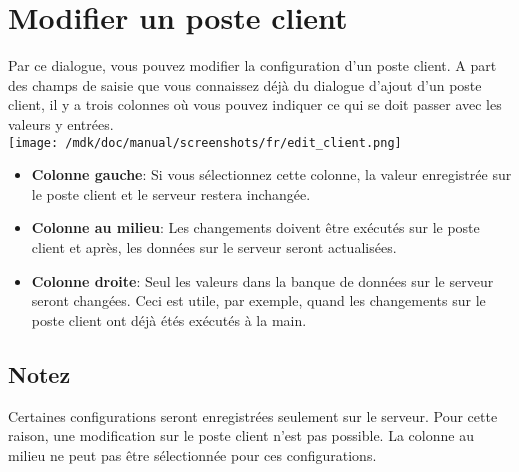 \section{Modifier un poste client}Par ce dialogue, vous pouvez modifier la configuration d'un poste client. A part des champs de saisie que vous connaissez d\'ej\`a du dialogue d'ajout d'un poste client, il y a trois colonnes o\`u vous pouvez indiquer ce qui se doit passer avec les valeurs y entr\'ees.\\
\texttt{[image: /mdk/doc/manual/screenshots/fr/edit\_client.png]} \\
\begin{itemize}
\item \textbf{Colonne gauche}: Si vous s\'electionnez cette colonne, la valeur enregistr\'ee sur le poste client et le serveur restera inchang\'ee.\\
\item \textbf{Colonne au milieu}: Les changements doivent \^etre ex\'ecut\'es sur le poste client et apr\`es, les donn\'ees sur le serveur seront actualis\'ees.\\
\item \textbf{Colonne droite}: Seul les valeurs dans la banque de donn\'ees sur le serveur seront chang\'ees. Ceci est utile, par exemple, quand les changements sur le poste client ont d\'ej\`a \'et\'es ex\'ecut\'es \`a la main.\\
\end{itemize}
\subsection{Notez}
Certaines configurations seront enregistr\'ees seulement sur le serveur. Pour cette raison, une modification sur le poste client n'est pas possible. La colonne au milieu ne peut pas \^etre s\'electionn\'ee pour ces configurations.\\
